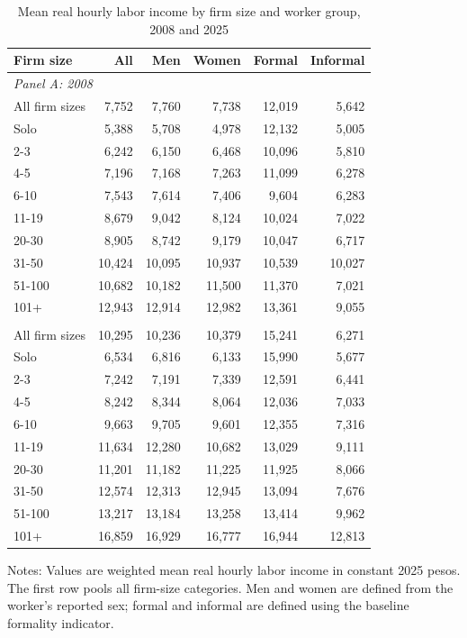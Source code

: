 \begin{table}[!htbp]
  \centering
  \caption{Mean real hourly labor income by firm size and worker group, 2008 and 2025}
  \label{tab:descriptive-wage-groups-mean-2008-2025}
  \small
  \begin{tabular}{lrrrrr}
    \toprule
    Firm size & All & Men & Women & Formal & Informal \\
    \midrule
    \multicolumn{6}{l}{\textit{Panel A: 2008}} \\
    All firm sizes & 7,752 & 7,760 & 7,738 & 12,019 & 5,642 \\
    Solo & 5,388 & 5,708 & 4,978 & 12,132 & 5,005 \\
    2-3 & 6,242 & 6,150 & 6,468 & 10,096 & 5,810 \\
    4-5 & 7,196 & 7,168 & 7,263 & 11,099 & 6,278 \\
    6-10 & 7,543 & 7,614 & 7,406 & 9,604 & 6,283 \\
    11-19 & 8,679 & 9,042 & 8,124 & 10,024 & 7,022 \\
    20-30 & 8,905 & 8,742 & 9,179 & 10,047 & 6,717 \\
    31-50 & 10,424 & 10,095 & 10,937 & 10,539 & 10,027 \\
    51-100 & 10,682 & 10,182 & 11,500 & 11,370 & 7,021 \\
    101+ & 12,943 & 12,914 & 12,982 & 13,361 & 9,055 \\
    \addlinespace
    \multicolumn{6}{l}{\textit{Panel B: 2025}} \\
    All firm sizes & 10,295 & 10,236 & 10,379 & 15,241 & 6,271 \\
    Solo & 6,534 & 6,816 & 6,133 & 15,990 & 5,677 \\
    2-3 & 7,242 & 7,191 & 7,339 & 12,591 & 6,441 \\
    4-5 & 8,242 & 8,344 & 8,064 & 12,036 & 7,033 \\
    6-10 & 9,663 & 9,705 & 9,601 & 12,355 & 7,316 \\
    11-19 & 11,634 & 12,280 & 10,682 & 13,029 & 9,111 \\
    20-30 & 11,201 & 11,182 & 11,225 & 11,925 & 8,066 \\
    31-50 & 12,574 & 12,313 & 12,945 & 13,094 & 7,676 \\
    51-100 & 13,217 & 13,184 & 13,258 & 13,414 & 9,962 \\
    101+ & 16,859 & 16,929 & 16,777 & 16,944 & 12,813 \\
    \bottomrule
  \end{tabular}
  \vspace{0.3em}
  \begin{minipage}{0.95\textwidth}
  \footnotesize
  Notes: Values are weighted mean real hourly labor income in constant 2025 pesos. The first row pools all firm-size categories. Men and women are defined from the worker's reported sex; formal and informal are defined using the baseline formality indicator.
  \end{minipage}
\end{table}
